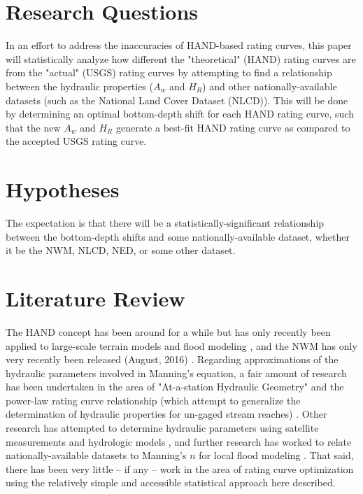 \documentclass[11pt]{article}
\begin{document}
\section*{Research Questions} %

In an effort to address the inaccuracies of HAND-based rating curves, this paper will statistically analyze how different the "theoretical" (HAND) rating curves are from the "actual" (USGS) rating curves by attempting to find a relationship between the hydraulic properties ($A_w$ and $H_R$) and other nationally-available datasets (such as the National Land Cover Dataset (NLCD)). This will be done by determining an optimal bottom-depth shift for each HAND rating curve, such that the new $A_w$ and $H_R$ generate a best-fit HAND rating curve as compared to the accepted USGS rating curve. 

\section*{Hypotheses} %

The expectation is that there will be a statistically-significant relationship between the bottom-depth shifts and some nationally-available dataset, whether it be the NWM, NLCD, NED, or some other dataset.  

\section*{Literature Review} %

The HAND concept has been around for a while but has only recently been applied to large-scale terrain models \cite{handpaper} and flood modeling \cite{nfiehand}, and the NWM has only very recently been released (August, 2016) \cite{nwmsummary}. Regarding approximations of the hydraulic parameters involved in Manning's equation, a fair amount of research has been undertaken in the area of "At-a-station Hydraulic Geometry" and the power-law rating curve relationship (which attempt to generalize the determination of hydraulic properties for un-gaged stream reaches) \cite{ahgdingman, ahgchen}. Other research has attempted to determine hydraulic parameters using satellite measurements and hydrologic models \cite{sathydroparams}, and further research has worked to relate nationally-available datasets to Manning's $n$ for local flood modeling \cite{ahgmoore}. That said, there has been very little -- if any -- work in the area of rating curve optimization using the relatively simple and accessible statistical approach here described. 
\end{document}
